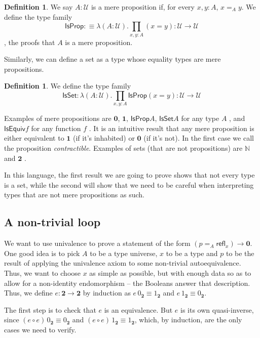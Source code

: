\documentclass[12 pt]{amsart}
\theoremstyle{definition}
\newtheorem{definition}[subsubsection]{Definition}
\theoremstyle{remark}
\newcommand{\Type}{\mathcal{U}}
\newcommand{\refl}{\mathsf{refl}}
\newcommand{\bool}{{\mathbf{2}}}
\newcommand{\boolone}{1_\bool}
\newcommand{\boolzero}{0_\bool}
\newcommand{\zero}{{\mathbf{0}}}
\newcommand{\one}{{\mathbf{1}}}
\newcommand{\IsEquiv}{\mathsf{IsEquiv}}
\newcommand{\IsProp}{\mathsf{IsProp}}
\newcommand{\IsSet}{\mathsf{IsSet}}
\begin{document}
\begin{definition}
We say $A : \Type$ is a mere proposition if, for every $x, y : A$, $x =_A y$. We define the type family
\[ \IsProp :\equiv \lambda (A : \Type). \prod_{x, y : A} (x = y) : \Type \to \Type\], the proofs that $A$ is a mere proposition.
\end{definition}

Similarly, we can define a set as a type whose equality types are mere propositions.

\begin{definition}
We define the type family
\[ \IsSet : \lambda (A : \Type) . \prod_{x , y : A} \IsProp (x = y) : \Type \to \Type\]
\end{definition}

Examples of mere propositions are $\zero$, $\one$, $\IsProp A$, $\IsSet A$ for any type $A$ \cite[Section 3.1]{hottbook}, and $\IsEquiv f$ for any function $f$ \cite[Chapter 4]{hottbook}. It is an intuitive result that any mere proposition is either equivalent to $\one$ (if it's inhabited) or $\zero$ (if it's not). In the first case we call the proposition \textit{contractible}. Examples of sets (that are not propositions) are $\mathbb{N}$ and $\bool$ \cite[Chapter 3]{hottbook}. 

In this language, the first result we are going to prove shows that not every type is a set, while the second will show that we need to be careful when interpreting types that are not mere propositions as such. 

\subsection{A non-trivial loop}
\label{subsec:nontrivialloop}
We want to use univalence to prove a statement of the form $(p =_A \refl_x) \to \zero$. One good idea is to pick $A$ to be a type universe, $x$ to be a type and $p$ to be the result of applying the univalence axiom to some non-trivial autoequivalence. Thus, we want to choose $x$ as simple as possible, but with enough data so as to allow for a non-identity endomorphism -- the Booleans answer that description. Thus, we define $e : \bool \to \bool$ by induction as $e\, \boolzero \equiv \boolone$ and $e\, \boolone \equiv \boolzero$.

The first step is to check that $e$ is an equivalence. But $e$ is its own quasi-inverse, since $(e\circ e)\, \boolzero \equiv \boolzero$ and $(e\circ e)\, \boolone \equiv \boolone$, which, by induction, are the only cases we need to verify.
\end{document}
